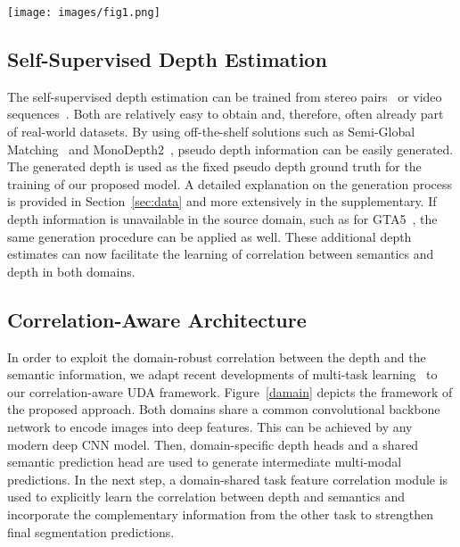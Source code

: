 \documentclass[10pt,twocolumn,letterpaper]{article}
\begin{document}
\begin{figure*}
	\centering
	\texttt{[image: images/fig1.png]}
	\caption{The network architecture of our proposed Correlation-Aware Domain Adaptation~(CorDA), in which we combine the proposed \textit{task feature correlation} module and the pseudo-label refinement based on \textit{adaptation difficulty transfer}. The semantic and depth features are processed by the domain-shared feature correlation module to explicitly learn the domain-robust correlation between them and provide complementary information for the other modality. In addition, as shown in the right-most side of the figure, during the training process, the semantic pseudo-labels are re-weighted based on the adaptation difficulty approximated by the depth prediction discrepancy.}
	\label{damain}
	\vspace{-5mm}
\end{figure*}


\subsection{Self-Supervised Depth Estimation}
The self-supervised depth estimation can be trained from stereo pairs~\cite{garg2016unsupervised, godard2017unsupervised} or video sequences~\cite{zhou2017unsupervised}. Both are relatively easy to obtain and, therefore, often already part of real-world datasets. By using off-the-shelf solutions such as Semi-Global Matching~\cite{hirschmuller2005accurate} and MonoDepth2~\cite{monodepth2}, pseudo depth information can be easily generated. The generated depth is used as the fixed pseudo depth ground truth for the training of our proposed model. A detailed explanation on the generation process is provided in Section~\ref{sec:data} and more extensively in the supplementary. If depth information is unavailable in the source domain, such as for GTA5~\cite{richter2016playing}, the same generation procedure can be applied  as well. These additional depth estimates can now facilitate the learning of correlation between semantics and depth in both domains.


\subsection{Correlation-Aware Architecture}
\label{sec:corrarchitecture}
In order to exploit the domain-robust correlation between the depth and the semantic information, we adapt recent developments of multi-task learning~\cite{xu2018pad, vandenhende2020mti} to our correlation-aware UDA framework. Figure~\ref{damain} depicts the framework of the proposed approach. Both domains share a common convolutional backbone network to encode images into deep features. This can be achieved by any modern deep CNN model. Then, domain-specific depth heads and a shared semantic prediction head are used to generate intermediate multi-modal predictions. In the next step, a domain-shared task feature correlation module is used to explicitly learn the correlation between depth and semantics and incorporate the complementary information from the other task to strengthen final segmentation predictions. 
\end{document}
